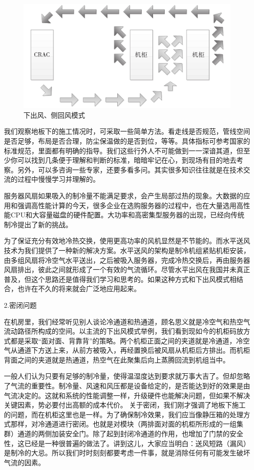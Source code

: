 \documentclass[12pt,UTF8]{ctexbook}
\begin{document}
\begin{figure}[htbp]
	\centering
	\includegraphics[width=1\linewidth]{3}
	\caption{下出风、侧回风模式}
	\label{fig:1}
\end{figure}

我们观察地板下的施工情况时，可采取一些简单方法。看走线是否规范，管线空间是否足够，布局是否合理，防尘保温做的是否到位，等等。具体指标可参考国家的标准规范，里面都有明确的指导。我们这些行外人不可能做到一一深谙其道，但至少你可以找到几条便于理解和判断的标准，暗暗牢记在心，到现场有目的地去考察。另外，可以多咨询一些专家，还要多看多问。其实很多知识往往就是在技术交流的过程中慢慢学习并理解的。

服务器风扇如果吸入的制冷量不能满足要求，会产生局部过热的现象。大数据的应用和强调高性能计算的今天，很多企业在选购服务器的过程中，也在大量选用高性能CPU和大容量磁盘的硬件配置。大功率和高密集型服务器的出现，已经向传统制冷提出了新的挑战。

为了保证充分有效地冷热交换，使用更高功率的风机显然是不节能的。而水平送风技术为我们提供了一种新的解决方案。水平送风的架构是制冷机组紧贴机柜安装，由多组风扇将冷空气水平送出，之后被吸入服务器，完成冷热交换后，再由服务器风扇排出，彼此之间就形成了一个有效的气流循环。尽管水平出风在我国并未真正普及，但这个思路还是值得我们学习和思考的。如果这种方式和下出风模式相结合，也许在不久的将来就会广泛地应用起来。

2.密闭问题

在机房里，我们经常听见别人谈论冷通道和热通道，顾名思义就是冷空气和热空气流动路径所构成的空间。以主流的下出风模式举例，我们看到现如今的机柜码放方式都是采取“面对面、背靠背”的策略。两个机柜正面之间的夹道就是冷通道，冷空气从通道下方送上来，从前方被吸入，再经置换后被风扇从机柜后方排出。而机柜背面之间的夹道就是热通道，热空气在此聚集后向上蒸腾回流到机组当中。

一般人们认为只要有足够的制冷量，使得温湿度达到要求就万事大吉了。但却忽略了气流的重要性。制冷量、风速和风压都是设备给定的，是否能达到好的效果是由气流决定的。这就和系统的性能调整一样，升级硬件也能解决问题，但如果不解决关键因素，势必要付出高额的成本代价。
关于密闭，我们刚才强调了地板下施工的问题，而在机柜这里也是一样。为了确保制冷效果，我们应当像静压箱的处理方式那样，对冷通道进行密闭。也就是对模块（两排面对面的机柜所形成的一组集群）通道的两侧加装安全门。除了起到封闭冷通道的作用，也增加了门禁的安全性，这已经是一种很普遍的做法了。讲到这儿，大家应当明白：送风短路（漏风）是制冷的大忌。所以我们时时刻刻都要考虑一件事，就是消除任何有可能发生破坏气流的因素。
\end{document}
